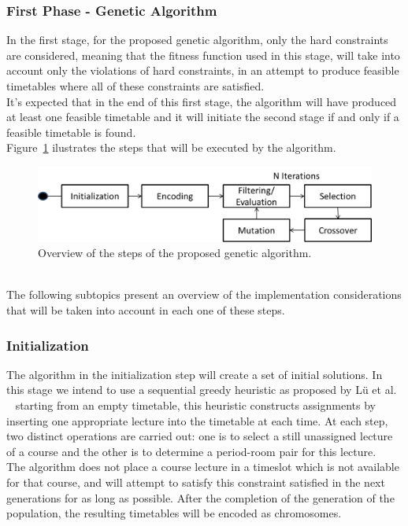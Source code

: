 \subsubsection{First Phase - Genetic Algorithm}
\label{subsubsec:genetic-algorithm}
In the first stage, for the proposed genetic algorithm, only the hard constraints are considered, meaning that the fitness function used in this stage, will take into account only the violations of hard constraints, in an attempt to produce feasible timetables where all of these constraints are satisfied.\\
It’s expected that in the end of this first stage, the algorithm will have produced at least one feasible timetable and it will initiate the second stage if and only if a feasible timetable is found.\\ 
Figure~\ref{fig:overviewProposedSteps} ilustrates the steps that will be executed by the algorithm.\\
\begin{figure}[h!]
 \centering
   \includegraphics[width=12cm]{./images/figures/Fig2_OverviewSteps_GA.png}
   \caption{Overview of the steps of the proposed genetic algorithm.}
   \label{fig:overviewProposedSteps}
\end{figure}\\
The following subtopics present an overview of the implementation considerations that will be taken into account in each one of these steps.\\
\subsubsection{Initialization}
\label{subsubsubsec:ga-initialization}
The algorithm in the initialization step will create a set of initial solutions. In this stage we intend to use a sequential greedy heuristic as proposed by Lü et al. ~\cite{Lue2010} starting from an empty timetable, this heuristic constructs assignments by inserting one appropriate lecture into the timetable at each time. At each step, two distinct operations are carried out: one is to select a still unassigned lecture of a course and the other is to determine a period-room pair for this lecture.\\
The algorithm does not place a course lecture in a timeslot which is not available for that course, and will attempt to satisfy this constraint satisfied in the next generations for as long as possible.  After the completion of the generation of the population, the resulting timetables will be encoded as chromosomes.\\
